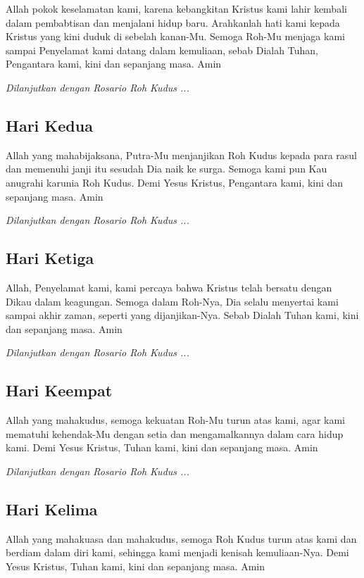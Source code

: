 \documentclass[a5paper,titlepage,11pt]{book}
\begin{document}
    Allah pokok keselamatan kami, karena kebangkitan Kristus kami lahir kembali dalam pembabtisan dan menjalani hidup baru. Arahkanlah hati kami kepada Kristus yang kini duduk di sebelah kanan-Mu. Semoga Roh-Mu menjaga kami sampai Penyelamat kami datang dalam kemuliaan, sebab Dialah Tuhan, Pengantara kami, kini dan sepanjang masa. Amin
    
    \emph{Dilanjutkan dengan Rosario Roh Kudus ...}
    
\subsection*{Hari Kedua}

    Allah yang mahabijaksana, Putra-Mu menjanjikan Roh Kudus kepada para rasul dan memenuhi janji itu sesudah Dia naik ke surga. Semoga kami pun Kau anugrahi karunia Roh Kudus. Demi Yesus Kristus, Pengantara kami, kini dan sepanjang masa. Amin
    
    \emph{Dilanjutkan dengan Rosario Roh Kudus ...}
    
\subsection*{Hari Ketiga}

    Allah, Penyelamat kami, kami percaya bahwa Kristus telah bersatu dengan Dikau dalam keagungan. Semoga dalam Roh-Nya, Dia selalu menyertai kami sampai akhir zaman, seperti yang dijanjikan-Nya. Sebab Dialah Tuhan kami, kini dan sepanjang masa. Amin
    
    \emph{Dilanjutkan dengan Rosario Roh Kudus ...}
    
\subsection*{Hari Keempat}

    Allah yang mahakudus, semoga kekuatan Roh-Mu turun atas kami, agar kami mematuhi kehendak-Mu dengan setia dan mengamalkannya dalam cara hidup kami. Demi Yesus Kristus, Tuhan kami, kini dan sepanjang masa. Amin
    
    \emph{Dilanjutkan dengan Rosario Roh Kudus ...}
    
\subsection*{Hari Kelima}

    Allah yang mahakuasa dan mahakudus, semoga Roh Kudus turun atas kami dan berdiam dalam diri kami, sehingga kami menjadi kenisah kemuliaan-Nya. Demi Yesus Kristus, Tuhan kami, kini dan sepanjang masa. Amin
    
\end{document}
